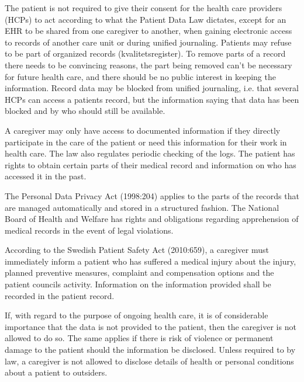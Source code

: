 \documentclass[14pt]{article}
\begin{document}
The patient is not required to give their consent for the health care providers (HCPs) to act according to what the Patient Data Law dictates, except for an EHR to be shared from one caregiver to another, when gaining electronic access to records of another care unit or during unified journaling. Patients may refuse to be part of organized records (kvalitetsregister). To remove parts of a record there needs to be convincing reasons, the part being removed can't be necessary for future health care, and there should be no public interest in keeping the information. Record data may be blocked from unified journaling, i.e. that several HCPs can access a patients record, but the information saying that data has been blocked and by who should still be available. 

A caregiver may only have access to documented information if they directly participate in the care of the patient or need this information for their work in health care. The law also regulates periodic checking of the logs. The patient has rights to obtain certain parts of their medical record and information on who has accessed it in the past.\cite{PatientDataAct}

The Personal Data Privacy Act (1998:204) applies to the parts of the records that are managed automatically and stored in a structured fashion. The National Board of Health and Welfare has rights and obligations regarding apprehension of medical records in the event of legal violations.\cite{PatientDataAct}

According to the Swedish Patient Safety Act (2010:659), a caregiver must immediately inform a patient who has suffered a medical injury about the injury, planned preventive measures, complaint and compensation
options and the patient councils activity. Information on the information provided shall be recorded in the patient record.\cite{PatientSafetyAct}

If, with regard to the purpose of ongoing health care, it is of considerable importance that the data is not provided to the patient, then the caregiver is not allowed to do so. The same applies if there is risk of violence or permanent damage to the patient should the information be disclosed. Unless required to by law, a caregiver is not allowed to disclose details of health or personal conditions about a patient to outsiders.\cite{PatientSafetyAct}
\end{document}
